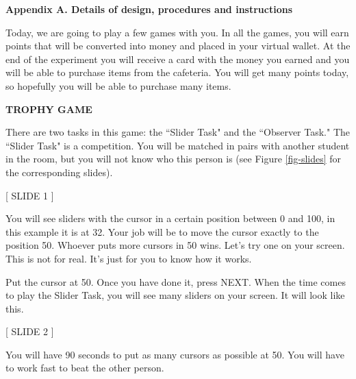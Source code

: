 \documentclass[11pt]{article}
\begin{document}
{\small

\centerline{\large {\bf Appendix A. Details of design, procedures and instructions}} \par \vspace*{6mm}

 \par \bigskip

\noindent 

Today, we are going to play a few games with you. In all the games, you will earn points that will be converted into money and placed in your virtual wallet. At the end of the experiment you will receive a card with the money you earned and you will be able to purchase items from the cafeteria. You will get many points today, so hopefully you will be able to purchase many items. \par \medskip


\centerline{\textbf{TROPHY GAME}} \par \medskip

\noindent There are two tasks in this game: the ``Slider Task" and the ``Observer Task." The ``Slider Task" is a competition. You will be matched in pairs with another student in the room, but you will not know who this person is (see Figure \ref{fig-slides} for the corresponding slides). \par \medskip

\centerline{[ SLIDE 1 ]} \par \medskip

\noindent You will see sliders with the cursor in a certain position between 0 and 100, in this example it is at 32. Your job will be to move the cursor exactly to the position 50. Whoever puts more cursors in 50 wins. Let’s try one on your screen. This is not for real. It’s just for you to know how it works. \par \medskip

 \par\medskip

\noindent Put the cursor at 50. Once you have done it, press NEXT. When the time comes to play the Slider Task, you will see many sliders on your screen. It will look like this. \par \medskip

\centerline{[ SLIDE 2 ]} \par \medskip

\noindent You will have 90 seconds to put as many cursors as possible at 50. You will have to work fast to beat the other person. \par \medskip

}
\end{document}
